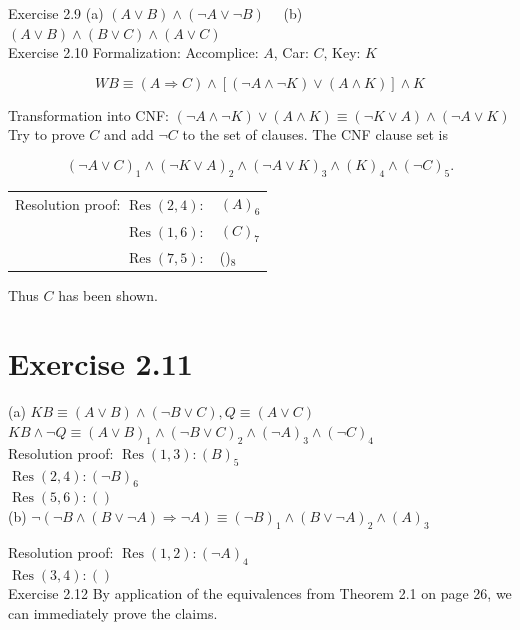 \documentclass[10pt]{book}
\begin{document}
Exercise 2.9 (a) $(A \vee B) \wedge(\neg A \vee \neg B) \quad$ (b) $(A \vee B) \wedge(B \vee C) \wedge(A \vee C)$\\
Exercise 2.10 Formalization: Accomplice: $A$, Car: $C$, Key: $K$

$$
W B \equiv(A \Rightarrow C) \wedge[(\neg A \wedge \neg K) \vee(A \wedge K)] \wedge K
$$

Transformation into CNF: $(\neg A \wedge \neg K) \vee(A \wedge K) \equiv(\neg K \vee A) \wedge(\neg A \vee K)$\\
Try to prove $C$ and add $\neg C$ to the set of clauses. The CNF clause set is

$$
(\neg A \vee C)_{1} \wedge(\neg K \vee A)_{2} \wedge(\neg A \vee K)_{3} \wedge(K)_{4} \wedge(\neg C)_{5} .
$$

\begin{center}
\begin{tabular}{rl}
Resolution proof: $\operatorname{Res}(2,4):$ & $(A)_{6}$ \\
$\operatorname{Res}(1,6):$ & $(C)_{7}$ \\
$\operatorname{Res}(7,5):$ & ()$_{8}$ \\
\end{tabular}
\end{center}

Thus $C$ has been shown.

\section*{Exercise 2.11}
(a) $K B \equiv(A \vee B) \wedge(\neg B \vee C), Q \equiv(A \vee C)$\\
$K B \wedge \neg Q \equiv(A \vee B)_{1} \wedge(\neg B \vee C)_{2} \wedge(\neg A)_{3} \wedge(\neg C)_{4}$\\
Resolution proof: $\operatorname{Res}(1,3):(B)_{5}$\\
$\operatorname{Res}(2,4):(\neg B)_{6}$\\
$\operatorname{Res}(5,6):()$\\
(b) $\neg(\neg B \wedge(B \vee \neg A) \Rightarrow \neg A) \equiv(\neg B)_{1} \wedge(B \vee \neg A)_{2} \wedge(A)_{3}$

Resolution proof: $\operatorname{Res}(1,2):(\neg A)_{4}$\\
$\operatorname{Res}(3,4):()$\\
Exercise 2.12 By application of the equivalences from Theorem 2.1 on page 26, we can immediately prove the claims.
\end{document}
